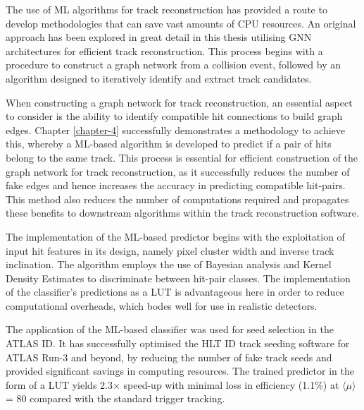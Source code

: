 The use of ML algorithms for track reconstruction has provided a route to develop methodologies that can save vast amounts of CPU resources. An original approach has been explored in great detail in this thesis utilising GNN architectures for efficient track reconstruction. This process begins with a procedure to construct a graph network from a collision event, followed by an algorithm designed to iteratively identify and extract track candidates. 



When constructing a graph network for track reconstruction, an essential aspect to consider is the ability to identify compatible hit connections to build graph edges. Chapter \ref{chapter-4} successfully demonstrates a methodology to achieve this, whereby a ML-based algorithm is developed to predict if a pair of hits belong to the same track. This process is essential for efficient construction of the graph network for track reconstruction, as it successfully reduces the number of fake edges and hence increases the accuracy in predicting compatible hit-pairs. This method also reduces the number of computations required and propagates these benefits to downstream algorithms within the track reconstruction software.

The implementation of the ML-based predictor begins with the exploitation of input hit features in its design, namely pixel cluster width and inverse track inclination. The algorithm employs the use of Bayesian analysis and Kernel Density Estimates to discriminate between hit-pair classes. The implementation of the classifier’s predictions as a LUT is advantageous here in order to reduce computational overheads, which bodes well for use in realistic detectors.

The application of the ML-based classifier was used for seed selection in the ATLAS ID. It has successfully optimised the HLT ID track seeding software for ATLAS Run-3 and beyond, by reducing the number of fake track seeds and provided significant savings in computing resources. The trained predictor in the form of a LUT yields 2.3$\times$ speed-up with minimal loss in efficiency (1.1\%) at $\langle \mu \rangle$ = 80 compared with the standard trigger tracking. 





